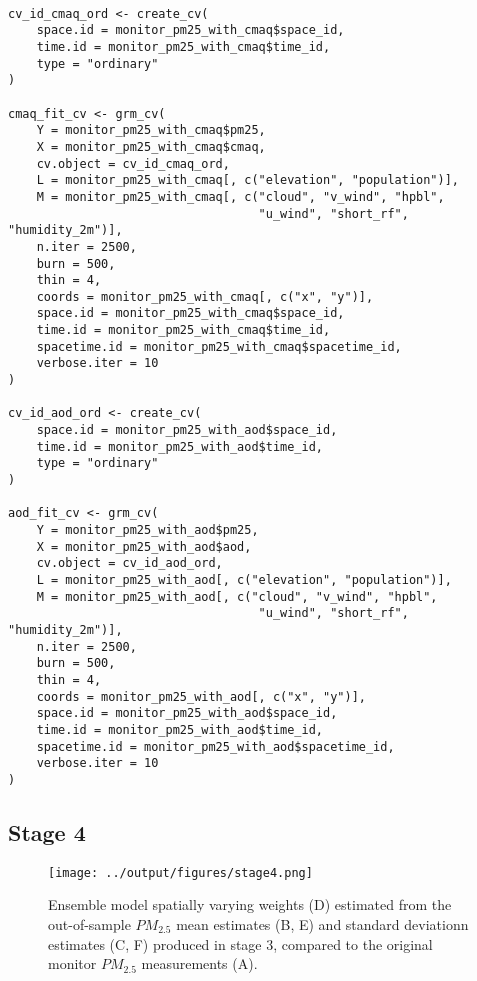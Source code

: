 \begin{lstlisting}

cv_id_cmaq_ord <- create_cv(
    space.id = monitor_pm25_with_cmaq$space_id,
    time.id = monitor_pm25_with_cmaq$time_id, 
    type = "ordinary"
)

cmaq_fit_cv <- grm_cv(
    Y = monitor_pm25_with_cmaq$pm25,
    X = monitor_pm25_with_cmaq$cmaq,
    cv.object = cv_id_cmaq_ord,
    L = monitor_pm25_with_cmaq[, c("elevation", "population")],
    M = monitor_pm25_with_cmaq[, c("cloud", "v_wind", "hpbl", 
                                   "u_wind", "short_rf", "humidity_2m")],
    n.iter = 2500,
    burn = 500,
    thin = 4,
    coords = monitor_pm25_with_cmaq[, c("x", "y")],
    space.id = monitor_pm25_with_cmaq$space_id,
    time.id = monitor_pm25_with_cmaq$time_id,
    spacetime.id = monitor_pm25_with_cmaq$spacetime_id,
    verbose.iter = 10
)

cv_id_aod_ord <- create_cv(
    space.id = monitor_pm25_with_aod$space_id,
    time.id = monitor_pm25_with_aod$time_id,
    type = "ordinary"
)

aod_fit_cv <- grm_cv(
    Y = monitor_pm25_with_aod$pm25,
    X = monitor_pm25_with_aod$aod,
    cv.object = cv_id_aod_ord,
    L = monitor_pm25_with_aod[, c("elevation", "population")],
    M = monitor_pm25_with_aod[, c("cloud", "v_wind", "hpbl", 
                                   "u_wind", "short_rf", "humidity_2m")],
    n.iter = 2500,
    burn = 500,
    thin = 4,
    coords = monitor_pm25_with_aod[, c("x", "y")],
    space.id = monitor_pm25_with_aod$space_id,
    time.id = monitor_pm25_with_aod$time_id,
    spacetime.id = monitor_pm25_with_aod$spacetime_id,
    verbose.iter = 10
)

\end{lstlisting}



\subsection*{Stage 4}

\begin{figure}[ht]
    \centering
    \texttt{[image: ../output/figures/stage4.png]}
    \caption{Ensemble model spatially varying weights (D) estimated from the out-of-sample $PM_{2.5}$ mean estimates (B, E) and standard deviationn estimates (C, F) produced in stage 3, compared to the original monitor $PM_{2.5}$ measurements (A).}
    \label{fig:stage4}
\end{figure}

